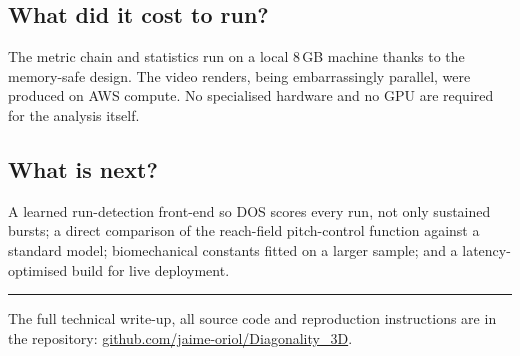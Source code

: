 \documentclass[11pt]{article}
\newcommand{\faq}[1]{\subsection{#1}}
\begin{document}
\faq{What did it cost to run?}
The metric chain and statistics run on a local 8\,GB machine thanks to the
memory-safe design. The video renders, being embarrassingly parallel, were
produced on AWS compute. No specialised hardware and no GPU are required
for the analysis itself.

\faq{What is next?}
A learned run-detection front-end so DOS scores every run, not only
sustained bursts; a direct comparison of the reach-field pitch-control
function against a standard model; biomechanical constants fitted on a
larger sample; and a latency-optimised build for live deployment.

\vspace{12pt}
\hrule
\vspace{6pt}
{\small The full technical write-up, all source code and reproduction
instructions are in the repository:
\href{https://github.com/jaime-oriol/Diagonality_3D}{github.com/jaime-oriol/Diagonality\_3D}.}
\end{document}
